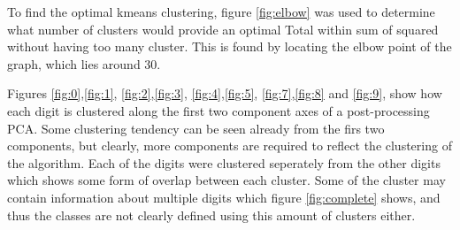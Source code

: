 \documentclass[10pt,a4paper]{article}
\begin{document}
To find the optimal kmeans clustering, figure \ref{fig:elbow} was used to determine
what number of clusters would provide an optimal Total within sum of squared without having too
many cluster.  This is found by locating the elbow point of the graph, which lies around 30. 

Figures \ref{fig:0},\ref{fig:1}, \ref{fig:2},\ref{fig:3}, \ref{fig:4},\ref{fig:5}, \ref{fig:7},\ref{fig:8} and \ref{fig:9}, show how each digit is clustered along
the first two component axes of a post-processing PCA.
Some clustering tendency can be seen already from the firs two components,
but clearly, more components are required to reflect the clustering of the algorithm.
Each of the digits were clustered seperately from the other digits
which shows some form of overlap between each cluster.
Some of the  cluster may contain information about multiple digits
which figure \ref{fig:complete} shows, and thus the classes are not clearly
defined using this amount of clusters either.
\end{document}
